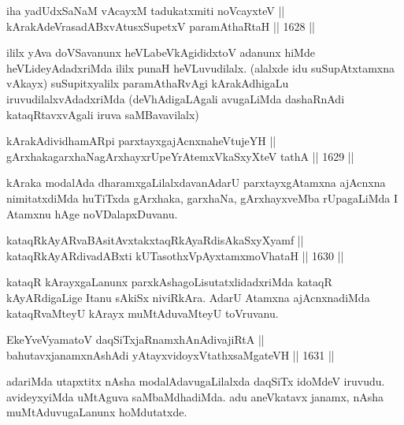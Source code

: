 \begin{shl}
iha yadUdxSaNaM vAcayxM tadukatxmiti noVcayxteV || \\
kArakAdeVrasadABxvAtusxSupetxV paramAthaRtaH \hfill || 1628 ||  
\end{shl}

\begin{artha}
ililx yAva doVSavanunx heVLabeVkAgididxtoV adanunx hiMde heVLideyAdadxriMda ililx punaH heVLuvudilalx. (alalxde idu suSupAtxtamxna vAkayx) suSupitxyalilx paramAthaRvAgi kArakAdhigaLu iruvudilalxvAdadxriMda (deVhAdigaLAgali avugaLiMda dashaRnAdi kataqRtavxvAgali iruva saMBavavilalx)
\end{artha}


\begin{shl}
kArakAdividhamAR\s pi parxtayxgajAcnxnaheVtujeYH || \\
gArxhakagarxhaNagArxhayxrUpeYrAtemxVkaSxyXteV tathA \hfill || 1629 ||  
\end{shl}

\begin{artha}
kAraka modalAda dharamxgaLilalxdavanAdarU parxtayxgAtamxna ajAcnxna nimitatxdiMda huTiTxda gArxhaka, garxhaNa, gArxhayxveMba rUpagaLiMda I Atamxnu hAge noVDalapxDuvanu.
\end{artha}


\begin{shl}
kataqRkAyARvaBAsitAvxtakxtaqRkAyaRdisAkaSxyXyamf || \\
kataqRkAyARdivadABxti kUTasothxV\s pAyxtamxmoVhataH \hfill || 1630 ||  
\end{shl}

\begin{artha}
kataqR kArayxgaLanunx parxkAshagoLisutatxlidadxriMda kataqR kAyARdigaLige Itanu sAkiSx niviRkAra. AdarU Atamxna ajAcnxnadiMda kataqRvaMteyU kArayx muMtAduvaMteyU toVruvanu.
\end{artha}

\begin{shl}
EkeYveVyamatoV daqSiTxjaRnamxhAnAdivajiRtA || \\
bahutavxjanamxnAshAdi yAtayxvidoyxVtathxsaMgateVH \hfill || 1631 ||  
\end{shl}

\begin{artha}
adariMda utapxtitx nAsha modalAdavugaLilalxda daqSiTx idoMdeV iruvudu. avideyxyiMda uMtAguva saMbaMdhadiMda. adu aneVkatavx janamx, nAsha muMtAduvugaLanunx hoMdutatxde.
\end{artha}

